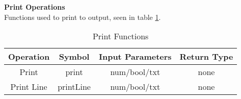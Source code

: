 \textbf{Print Operations}\\
Functions used to print to output, seen in table \ref{tbl:print}.
\begin{table}[h]
	\centering
	\caption{Print Functions}
	\label{tbl:print}
	\begin{tabular}{|c|c|c|c|}
		\hline
		Operation  & Symbol    & Input Parameters & Return Type \\ \hline
		Print      & print     & num/bool/txt     & none        \\ \hline
		Print Line & printLine & num/bool/txt     & none        \\ \hline
	\end{tabular}
\end{table}